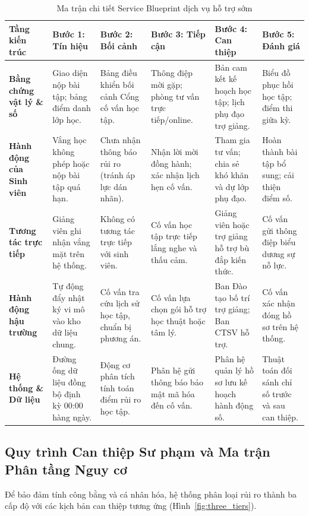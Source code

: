 \begin{table}[htbp]
\centering
\caption{Ma trận chi tiết Service Blueprint dịch vụ hỗ trợ sớm}
\label{tab:service_blueprint}
\vspace{0.2cm}
\fontsize{8}{10}\selectfont
\begin{tabularx}{\textwidth}{|L{2.4cm}|Y|Y|Y|Y|Y|}
\hline
\textbf{Tầng kiến trúc} & \textbf{Bước 1: Tín hiệu} & \textbf{Bước 2: Bối cảnh} & \textbf{Bước 3: Tiếp cận} & \textbf{Bước 4: Can thiệp} & \textbf{Bước 5: Đánh giá} \\
\hline
\textbf{Bằng chứng vật lý \& số} & Giao diện nộp bài tập; bảng điểm danh lớp học. & Bảng điều khiển bối cảnh Cổng cố vấn học tập. & Thông điệp mời gặp; phòng tư vấn trực tiếp/online. & Bản cam kết kế hoạch học tập; lịch phụ đạo trợ giảng. & Biểu đồ phục hồi học tập; điểm thi giữa kỳ. \\
\hline
\textbf{Hành động của Sinh viên} & Vắng học không phép hoặc nộp bài tập quá hạn. & Chưa nhận thông báo rủi ro (tránh áp lực dán nhãn). & Nhận lời mời đồng hành; xác nhận lịch hẹn cố vấn. & Tham gia tư vấn; chia sẻ khó khăn và dự lớp phụ đạo. & Hoàn thành bài tập bổ sung; cải thiện điểm số. \\
\hline
\textbf{Tương tác trực tiếp} & Giảng viên ghi nhận vắng mặt trên hệ thống. & Không có tương tác trực tiếp với sinh viên. & Cố vấn học tập trực tiếp lắng nghe và thấu cảm. & Giảng viên hoặc trợ giảng hỗ trợ bù đắp kiến thức. & Cố vấn gửi thông điệp biểu dương sự nỗ lực. \\
\hline
\textbf{Hành động hậu trường} & Tự động đẩy nhật ký vi mô vào kho dữ liệu chung. & Cố vấn tra cứu lịch sử học tập, chuẩn bị phương án. & Cố vấn lựa chọn gói hỗ trợ học thuật hoặc tâm lý. & Ban Đào tạo bố trí trợ giảng; Ban CTSV hỗ trợ. & Cố vấn xác nhận đóng hồ sơ trên hệ thống. \\
\hline
\textbf{Hệ thống \& Dữ liệu} & Đường ống dữ liệu đồng bộ định kỳ 00:00 hàng ngày. & Động cơ phân tích tính toán điểm rủi ro học tập. & Phân hệ gửi thông báo bảo mật mã hóa đến cố vấn. & Phân hệ quản lý hồ sơ lưu kế hoạch hành động số. & Thuật toán đối sánh chỉ số trước và sau can thiệp. \\
\hline
\end{tabularx}
\end{table}

\subsection{Quy trình Can thiệp Sư phạm và Ma trận Phân tầng Nguy cơ}
Để bảo đảm tính công bằng và cá nhân hóa, hệ thống phân loại rủi ro thành ba cấp độ với các kịch bản can thiệp tương ứng (Hình~\ref{fig:three_tiers}).

